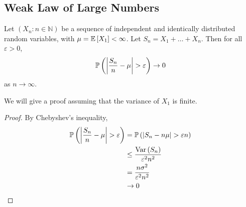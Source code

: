\subsection{Weak Law of Large Numbers}
\begin{theorem}
	Let \((X_n \colon n \in \mathbb N)\) be a sequence of independent and identically distributed random variables, with \(\mu = \mathbb{E}\left[{X_1}\right] < \infty\).
	Let \(S_n = X_1 + \dots + X_n\).
	Then for all \(\varepsilon > 0\),
	\[
		\mathbb{P}\left({\abs{\frac{S_n}{n} - \mu} > \varepsilon}\right) \to 0
	\]
	as \(n \to \infty\).
\end{theorem}
\noindent We will give a proof assuming that the variance of \(X_1\) is finite.
\begin{proof}
	By Chebyshev's inequality,
	\begin{align*}
		\mathbb{P}\left({\abs{\frac{S_n}{n} - \mu} > \varepsilon}\right) & = \mathbb{P}\left({\abs{S_n - n\mu} > \varepsilon n}\right) \\
		                                               & \leq \frac{\operatorname{Var}\left({S_n}\right)}{\varepsilon^2 n^2}  \\
		                                               & = \frac{n\sigma^2}{\varepsilon^2 n^2}     \\
		                                               & \to 0
	\end{align*}
\end{proof}
